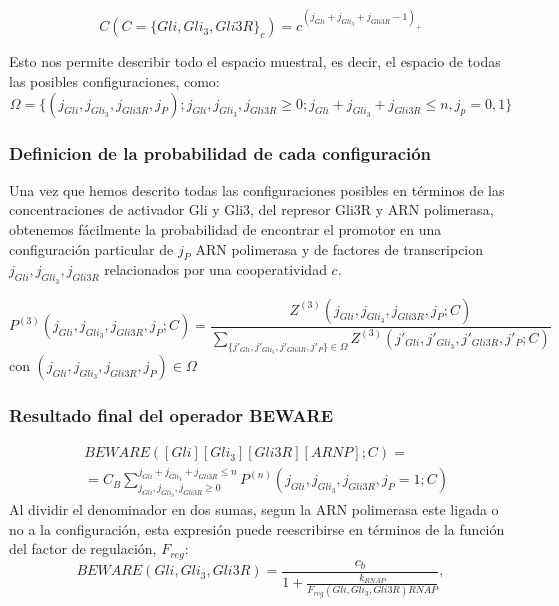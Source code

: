 \begin{equation}
C(C=\{Gli,Gli_3,Gli3R\}_c)=c^{(j_{Gli}+ j_{Gli_3}+ j_{Gli3R}-1)_+}
\end{equation}

Esto nos permite describir todo el espacio muestral, es decir, el espacio de todas las posibles configuraciones, como:
\begin{equation}
\Omega=\{(j_{Gli}, j_{Gli_3}, j_{Gli3R},j_P);j_{Gli}, j_{Gli_3}, j_{Gli3R}\geq0;j_{Gli}+ j_{Gli_3}+ j_{Gli3R}\leq n,j_p=0,1\}
\end{equation}


\subsubsection{Definicion de la probabilidad de cada configuración}

Una vez que hemos descrito todas las configuraciones posibles en términos de las concentraciones de activador Gli y Gli3, del represor Gli3R y ARN polimerasa, obtenemos fácilmente la probabilidad de encontrar el promotor en una configuración particular de $j_P$ ARN polimerasa y de factores de transcripcion $j_{Gli}, j_{Gli_3}, j_{Gli3R}$ relacionados por una cooperatividad $c$.

\begin{equation}
P^{(3)}(j_{Gli}, j_{Gli_3}, j_{Gli3R},j_P;C)=\frac{Z^{(3)}(j_{Gli}, j_{Gli_3}, j_{Gli3R},j_P;C)}{\sum_{\{j'_{Gli}, j'_{Gli_3}, j'_{Gli3R},j'_P\}\in\Omega}Z^{(3)}(j'_{Gli}, j'_{Gli_3}, j'_{Gli3R},j'_P;C)}
\label{probabilidad}
\end{equation}
 con $(j_{Gli}, j_{Gli_3}, j_{Gli3R},j_P)\in\Omega$
 
\subsubsection{Resultado final del operador BEWARE}
\begin{equation}
\begin{split}
&BEWARE([Gli][Gli_3][Gli3R][ARNP];C)=\\&=C_B\sum_{j_{Gli}, j_{Gli_3}, j_{Gli3R}\geq0}^{j_{Gli}+ j_{Gli_3}+ j_{Gli3R}\leq n}P^{(n)}(j_{Gli}, j_{Gli_3}, j_{Gli3R},j_P=1;C)
\end{split}
\end{equation}
Al dividir el denominador en dos sumas, segun la ARN polimerasa este ligada o no a la configuración, esta expresión puede reescribirse en términos de la función del factor de regulación, $F_{reg}$:
\begin{equation}
BEWARE(Gli, Gli_3, Gli3R)=\frac{c_{b}}{1 + \frac{k_{RNAP}}{F_{reg}(Gli, Gli_3, Gli3R) RNAP}},
\end{equation}


